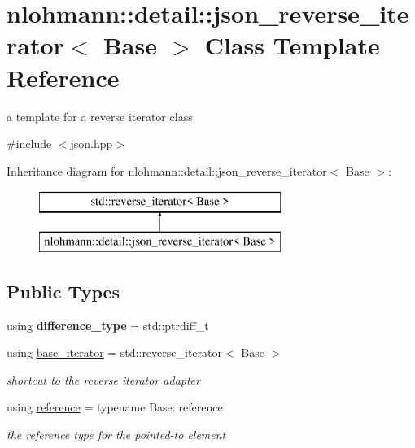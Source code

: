 \hypertarget{classnlohmann_1_1detail_1_1json__reverse__iterator}{}\section{nlohmann\+:\+:detail\+:\+:json\+\_\+reverse\+\_\+iterator$<$ Base $>$ Class Template Reference}
\label{classnlohmann_1_1detail_1_1json__reverse__iterator}


a template for a reverse iterator class  




{\ttfamily \#include $<$json.\+hpp$>$}

Inheritance diagram for nlohmann\+:\+:detail\+:\+:json\+\_\+reverse\+\_\+iterator$<$ Base $>$\+:\begin{figure}[H]
\begin{center}
\leavevmode
\includegraphics[height=2.000000cm]{classnlohmann_1_1detail_1_1json__reverse__iterator}
\end{center}
\end{figure}
\subsection*{Public Types}
\begin{DoxyCompactItemize}
\item 
\mbox{\label{classnlohmann_1_1detail_1_1json__reverse__iterator_a9ab55987c05ec6427ad36082e351cc45}} 
using {\bfseries difference\+\_\+type} = std\+::ptrdiff\+\_\+t
\item 
\mbox{\label{classnlohmann_1_1detail_1_1json__reverse__iterator_a6b2ef1d632fe49bfcc22fbd1abd62395}} 
using \mbox{\hyperlink{classnlohmann_1_1detail_1_1json__reverse__iterator_a6b2ef1d632fe49bfcc22fbd1abd62395}{base\+\_\+iterator}} = std\+::reverse\+\_\+iterator$<$ Base $>$
\begin{DoxyCompactList}\small\item\em shortcut to the reverse iterator adapter \end{DoxyCompactList}\item 
\mbox{\label{classnlohmann_1_1detail_1_1json__reverse__iterator_a42f51a69bac7b2aebb613b2164e457f1}} 
using \mbox{\hyperlink{classnlohmann_1_1detail_1_1json__reverse__iterator_a42f51a69bac7b2aebb613b2164e457f1}{reference}} = typename Base\+::reference
\begin{DoxyCompactList}\small\item\em the reference type for the pointed-\/to element \end{DoxyCompactList}\end{DoxyCompactItemize}
